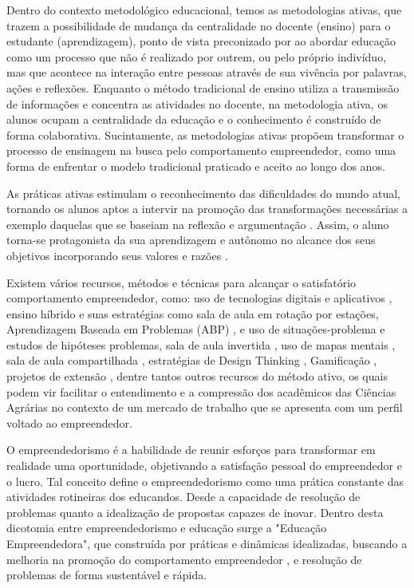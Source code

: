 Dentro do contexto metodológico educacional, temos as metodologias ativas, que trazem a possibilidade de mudança da centralidade no docente (ensino) para o estudante (aprendizagem), ponto de vista preconizado por  ao abordar educação como um processo que não é realizado por outrem, ou pelo próprio indivíduo, mas que acontece na interação entre pessoas através de sua vivência por palavras, ações e reflexões. 
Enquanto o método tradicional de ensino utiliza a transmissão de informações e concentra as atividades no docente, na metodologia ativa, os alunos ocupam a centralidade da educação e o conhecimento é construído de forma colaborativa. Sucintamente, as metodologias ativas propõem transformar o processo de ensinagem na busca pelo comportamento empreendedor, como uma forma de enfrentar o modelo tradicional praticado e aceito ao longo dos anos.
 
As práticas ativas estimulam o reconhecimento das dificuldades do mundo atual, tornando os alunos aptos a intervir na promoção das transformações necessárias a exemplo daquelas que se baseiam na reflexão e argumentação \cite{bezanilla_methodologies_2019}. Assim, o aluno torna-se protagonista da sua aprendizagem e autônomo no alcance dos seus objetivos incorporando seus valores e razões \cite{rubel_student_2016}. 

Existem vários recursos, métodos e técnicas para alcançar o satisfatório comportamento empreendedor, como: uso de tecnologias digitais e aplicativos \cite{pereira_use_2020}, ensino híbrido e suas estratégias como sala de aula em rotação por estações, Aprendizagem Baseada em Problemas (ABP) \cite{souza_aprendizagem_2015}, e uso de situações-problema e estudos de hipóteses problemas, sala de aula invertida \cite{junior_sala_2016,branco_sala_2016}, uso de mapas mentais \cite{junior_percepcao_2018}, sala de aula compartilhada \cite{strack_por_2009}, estratégias de Design Thinking \cite{andrews_circular_2015}, Gamificação \cite{ogawa_avaliacao_2016}, projetos de extensão \cite{garcia_contribuicao_2012}, dentre tantos outros recursos do método ativo, os quais podem vir facilitar o entendimento e a compressão dos acadêmicos das Ciências Agrárias no contexto de um mercado de trabalho que se apresenta com um perfil voltado ao empreendedor.

O empreendedorismo é a habilidade de reunir esforços para transformar em realidade uma oportunidade, objetivando a satisfação pessoal do empreendedor e o lucro. Tal conceito define o empreendedorismo como uma prática constante das atividades rotineiras dos educandos. Desde a capacidade de resolução de problemas quanto a idealização de propostas capazes de inovar. Dentro desta dicotomia entre empreendedorismo e educação surge a "Educação Empreendedora", que construída por práticas e dinâmicas idealizadas, buscando a melhoria na promoção do comportamento empreendedor \cite{martins_educacao_2016, morais_empreendedorismo_2018}, e resolução de problemas de forma sustentável e rápida.

